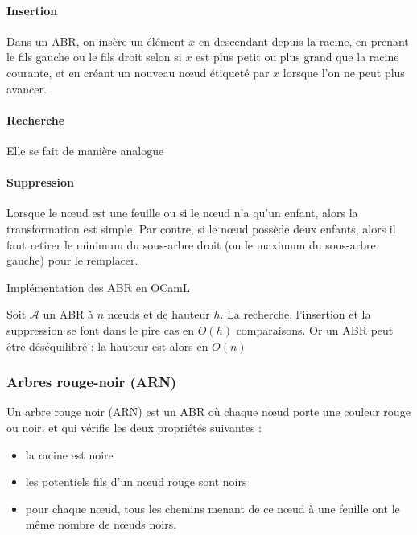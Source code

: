 \paragraph{Insertion} Dans un ABR, on insère un élément $x$ en descendant depuis la racine, en prenant le fils gauche ou le fils droit selon si $x$ est plus petit ou plus grand que la racine courante, et en créant un nouveau nœud étiqueté par $x$ lorsque l’on ne peut plus avancer.
	
\paragraph{Recherche} Elle se fait de manière analogue

\paragraph{Suppression} Lorsque le nœud est une feuille ou si le nœud n’a qu’un enfant, alors la transformation est simple. Par contre, si le nœud possède deux enfants, alors il faut retirer le minimum du sous-arbre droit (ou le maximum du sous-arbre gauche) pour le remplacer.

\begin{exercise}
	Implémentation des ABR en OCamL
\end{exercise}

\begin{proposition}
	Soit $\mathcal A$ un ABR à $n$ nœuds et de hauteur $h$. La recherche, l’insertion et la suppression	se font dans le pire cas en $O(h)$ comparaisons. Or un ABR peut être déséquilibré : la hauteur est alors en $O(n)$
\end{proposition}

\subsubsection{Arbres rouge-noir (ARN)}

\begin{definition}
	 Un arbre rouge noir (ARN) est un ABR où chaque nœud porte une couleur rouge ou noir, et qui vérifie les deux propriétés suivantes : \begin{itemize}
		\item la racine est noire 
		\item les potentiels fils d'un nœud rouge sont noirs
		\item pour chaque nœud, tous les chemins menant de ce nœud à une feuille ont le même nombre de nœuds noirs. 
	\end{itemize}
\end{definition}

